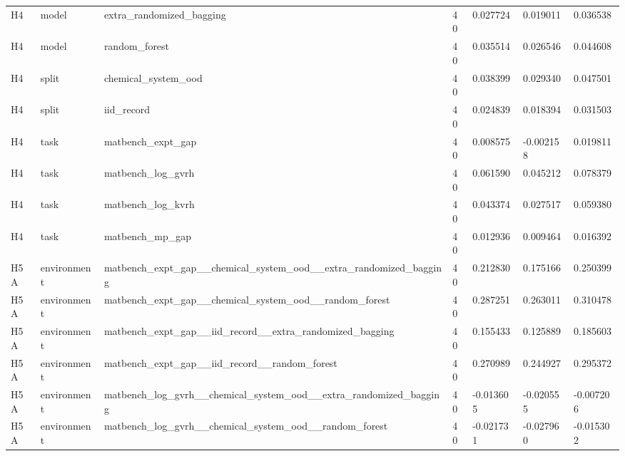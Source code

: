 \documentclass[10pt]{article}
\begin{document}
\begin{landscape}
\begin{longtable}{L{.35in}L{.6in}L{3.55in}L{.4in}L{.88in}L{.88in}L{.88in}}
H4 & model & extra\_\allowbreak{}randomized\_\allowbreak{}bagging & 40 & 0.027724 & 0.019011 & 0.036538\\
H4 & model & random\_\allowbreak{}forest & 40 & 0.035514 & 0.026546 & 0.044608\\
H4 & split & chemical\_\allowbreak{}system\_\allowbreak{}ood & 40 & 0.038399 & 0.029340 & 0.047501\\
H4 & split & iid\_\allowbreak{}record & 40 & 0.024839 & 0.018394 & 0.031503\\
H4 & task & matbench\_\allowbreak{}expt\_\allowbreak{}gap & 40 & 0.008575 & -0.002158 & 0.019811\\
H4 & task & matbench\_\allowbreak{}log\_\allowbreak{}gvrh & 40 & 0.061590 & 0.045212 & 0.078379\\
H4 & task & matbench\_\allowbreak{}log\_\allowbreak{}kvrh & 40 & 0.043374 & 0.027517 & 0.059380\\
H4 & task & matbench\_\allowbreak{}mp\_\allowbreak{}gap & 40 & 0.012936 & 0.009464 & 0.016392\\
H5A & environment & matbench\_\allowbreak{}expt\_\allowbreak{}gap\_\allowbreak{}\_\allowbreak{}chemical\_\allowbreak{}system\_\allowbreak{}ood\_\allowbreak{}\_\allowbreak{}extra\_\allowbreak{}randomized\_\allowbreak{}bagging & 40 & 0.212830 & 0.175166 & 0.250399\\
H5A & environment & matbench\_\allowbreak{}expt\_\allowbreak{}gap\_\allowbreak{}\_\allowbreak{}chemical\_\allowbreak{}system\_\allowbreak{}ood\_\allowbreak{}\_\allowbreak{}random\_\allowbreak{}forest & 40 & 0.287251 & 0.263011 & 0.310478\\
H5A & environment & matbench\_\allowbreak{}expt\_\allowbreak{}gap\_\allowbreak{}\_\allowbreak{}iid\_\allowbreak{}record\_\allowbreak{}\_\allowbreak{}extra\_\allowbreak{}randomized\_\allowbreak{}bagging & 40 & 0.155433 & 0.125889 & 0.185603\\
H5A & environment & matbench\_\allowbreak{}expt\_\allowbreak{}gap\_\allowbreak{}\_\allowbreak{}iid\_\allowbreak{}record\_\allowbreak{}\_\allowbreak{}random\_\allowbreak{}forest & 40 & 0.270989 & 0.244927 & 0.295372\\
H5A & environment & matbench\_\allowbreak{}log\_\allowbreak{}gvrh\_\allowbreak{}\_\allowbreak{}chemical\_\allowbreak{}system\_\allowbreak{}ood\_\allowbreak{}\_\allowbreak{}extra\_\allowbreak{}randomized\_\allowbreak{}bagging & 40 & -0.013605 & -0.020555 & -0.007206\\
H5A & environment & matbench\_\allowbreak{}log\_\allowbreak{}gvrh\_\allowbreak{}\_\allowbreak{}chemical\_\allowbreak{}system\_\allowbreak{}ood\_\allowbreak{}\_\allowbreak{}random\_\allowbreak{}forest & 40 & -0.021731 & -0.027960 & -0.015302\\

\end{longtable}
\end{landscape}
\end{document}
